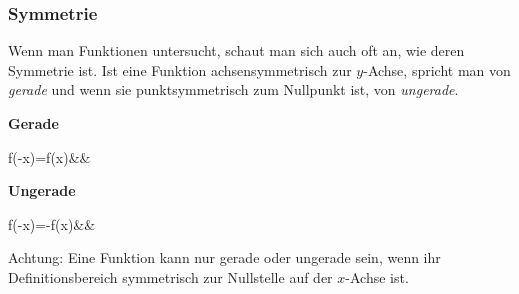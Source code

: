 \documentclass[12pt]{article}
\begin{document}
				\subsubsection{Symmetrie}
				\label{subsubsec:symmetrie}
				Wenn man Funktionen untersucht, schaut man sich auch oft an, wie deren Symmetrie ist. Ist eine Funktion achsensymmetrisch zur $y$-Achse, spricht man von \textit{gerade} und wenn sie punktsymmetrisch zum Nullpunkt ist, von \textit{ungerade}.
				\begin{tcolorbox}[boxsep=0pt,top=1cm,left=1cm,right=1cm, bottom=.75cm,arc=0pt,auto outer arc,colback=white,colframe=black, enlarge top by=.25cm, enlarge bottom by=.25cm]
					\textbf{Gerade}
					\begin{flalign*}
					f(-x)=f(x)&&
					\end{flalign*}
					\textbf{Ungerade}
					\begin{flalign*}
					\text{wenn }f(-x)=-f(x)&&
					\end{flalign*}
				\end{tcolorbox}
				\noindent Achtung: Eine Funktion kann nur gerade oder ungerade sein, wenn ihr Definitionsbereich symmetrisch zur Nullstelle auf der $x$-Achse ist.
\end{document}
